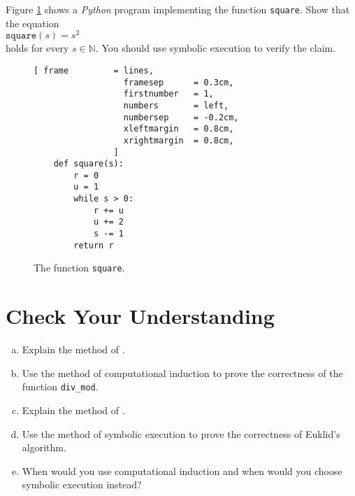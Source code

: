 \pagebreak
\exerciseEng
Figure \ref{fig:square-iterative} shows a \textsl{Python} program implementing the function \texttt{square}.  Show that the equation
\\[0.2cm]
\hspace*{1.3cm}
$\mathtt{square}(s) = s^2$
\\[0.2cm]
holds for every $s \in \mathbb{N}$.  You should use symbolic execution to verify the claim.
\eox

\begin{figure}[!ht]
\centering
\begin{Verbatim}[ frame         = lines, 
                  framesep      = 0.3cm, 
                  firstnumber   = 1,
                  numbers       = left,
                  numbersep     = -0.2cm,
                  xleftmargin   = 0.8cm,
                  xrightmargin  = 0.8cm,
                ]
    def square(s):
        r = 0
        u = 1
        while s > 0:
            r += u
            u += 2
            s -= 1
        return r
\end{Verbatim}
\vspace*{-0.3cm}
\caption{The function \texttt{square}.}
\label{fig:square-iterative}
\end{figure}



\section{Check Your Understanding}
\begin{enumerate}[(a)]
\item Explain the method of .
\item Use the method of computational induction to prove the correctness of the function \texttt{div\_mod}.
\item Explain the method of .
\item Use the method of symbolic execution to prove the correctness of Euklid's algorithm.
\item When would you use computational induction and when would you choose symbolic execution instead?
\end{enumerate}

